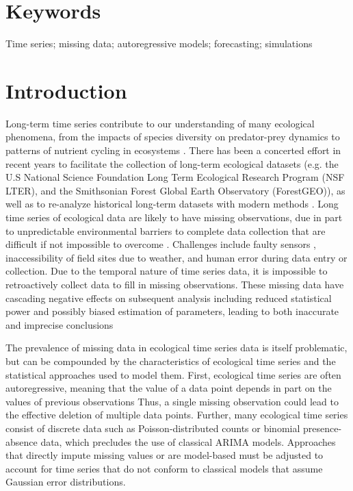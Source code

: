 \documentclass{article}
\begin{document}
\section*{Keywords}
Time series; missing data; autoregressive models; forecasting; simulations

\section*{Introduction} 

Long-term time series contribute to our understanding of many ecological phenomena, from the impacts of species diversity on predator-prey dynamics to patterns of nutrient cycling in ecosystems \citep{Hughes2017, Likens1970, Sinclair2003}. There has been a concerted effort in recent years to facilitate the collection of long-term ecological datasets (e.g. the U.S National Science Foundation Long Term Ecological Research Program (NSF LTER), and the Smithsonian Forest Global Earth Observatory (ForestGEO)), as well as to re-analyze historical long-term datasets with modern methods \citep{Adler2009, Buma2017}. Long time series of ecological data are likely to have missing observations, due in part to unpredictable environmental barriers to complete data collection that are difficult if not impossible to overcome \citep{lopucki2022handling, nakagawa_missing_2008}. Challenges include faulty sensors \citep{hossie_confronting_2021}, inaccessibility of field sites due to weather, and human error during data entry or collection. Due to the temporal nature of time series data, it is impossible to retroactively collect data to fill in missing observations. These missing data have cascading negative effects on subsequent analysis including reduced statistical power \citep{kang2013prevention, moritz_imputets_2017} and possibly biased estimation of parameters, leading to both inaccurate and imprecise conclusions \citep{aleryani2018dealing, kim_transcending_2018, junger_imputation_2015}


The prevalence of missing data in ecological time series data is itself problematic, but can be compounded by the characteristics of ecological time series and the statistical approaches used to model them. First, ecological time series are often autoregressive, meaning that the value of a data point depends in part on the values of previous observations %
Thus, a single missing observation could lead to the effective deletion of multiple data points. Further, many ecological time series consist of discrete data such as Poisson-distributed counts or binomial presence-absence data, which precludes the use of classical ARIMA models. Approaches that directly impute missing values or are model-based must be adjusted to account for time series that do not conform to classical models that assume Gaussian error distributions.
\end{document}
